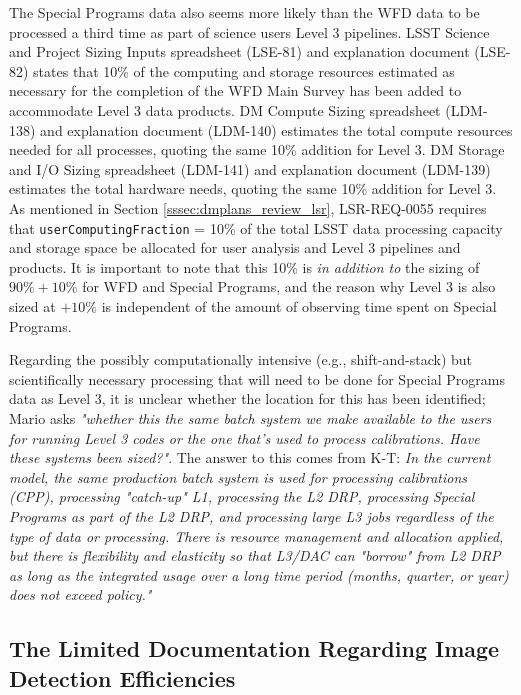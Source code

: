 \documentclass[DM,lsstdraft,toc]{lsstdoc}
\begin{document}
The Special Programs data also seems more likely than the WFD data to be processed a third time as part of science users Level 3 pipelines. LSST Science and Project Sizing Inputs spreadsheet (LSE-81) and explanation document (LSE-82) states that 10\% of the computing and storage resources estimated as necessary for the completion of the WFD Main Survey has been added to accommodate Level 3 data products. DM Compute Sizing spreadsheet (LDM-138) and explanation document (LDM-140) estimates the total compute resources needed for all processes, quoting the same 10\% addition for Level 3. DM Storage and I/O Sizing spreadsheet (LDM-141) and explanation document (LDM-139) estimates the total hardware needs, quoting the same 10\% addition for Level 3. As mentioned in Section \ref{sssec:dmplans_review_lsr}, LSR-REQ-0055 requires that {\tt userComputingFraction} = 10\% of the total LSST data processing capacity and storage space be allocated for user analysis and Level 3 pipelines and products. It is important to note that this 10\% is {\it in addition to} the sizing of $90\%+10\%$ for WFD and Special Programs, and the reason why Level 3 is also sized at $+10\%$ is independent of the amount of observing time spent on Special Programs.

Regarding the possibly computationally intensive (e.g., shift-and-stack) but scientifically necessary processing that will need to be done for Special Programs data as Level 3, it is unclear whether the location for this has been identified; Mario asks {\it "whether this the same batch system we make available to the users for running Level 3 codes or the one that's used to process calibrations. Have these systems been sized?"}. The answer to this comes from K-T: {\it In the current model, the same production batch system is used for processing calibrations (CPP), processing "catch-up" L1, processing
the L2 DRP, processing Special Programs as part of the L2 DRP, and processing large L3 jobs regardless of the type of data or processing. There is resource management and allocation applied, but there is flexibility and elasticity so that L3/DAC can "borrow" from L2 DRP as long as the integrated usage over a long time period (months, quarter, or year) does not exceed policy."}


\subsection{The Limited Documentation Regarding Image Detection Efficiencies}
\end{document}
